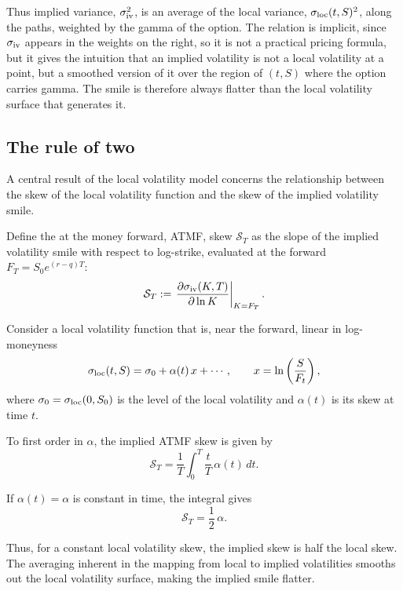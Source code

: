Thus implied variance, $\sigma_{\mathrm{iv}}^2$,
is an average of the local variance, $\sigma_{\mathrm{loc}}(t, S)^2$, along the paths,
weighted by the gamma of the option.
The relation is implicit, since $\sigma_{\mathrm{iv}}$ appears in the weights on the right,
so it is not a practical pricing formula,
but it gives the intuition that an implied volatility is not a local volatility at a point,
but a smoothed version of it over the region of $(t, S)$ where the option carries gamma.
The smile is therefore always flatter than the local volatility surface that generates it.

\subsection{The rule of two}\label{sec:rule_of_two}

A central result of the local volatility model concerns the relationship
between the skew of the local volatility function and the skew of the implied volatility smile.

Define the at the money forward, ATMF,
skew $\mathcal{S}_T$ as the slope of the implied volatility smile
with respect to log-strike, evaluated at the forward $F_T = S_0 e^{(r-q)T}$:
\begin{equation}\label{eq:atmf_skew}
    \mathcal{S}_T := \left.\frac{\partial \sigma_{\mathrm{iv}}(K,T)}{\partial \ln K}\right|_{K=F_T}.
\end{equation}

Consider a local volatility function that is, near the forward, linear in log-moneyness
\begin{equation}\label{eq:lv_skew_expansion}
    \sigma_{\mathrm{loc}}(t, S) = \sigma_0 + \alpha(t)\, x + \cdots, \qquad x = \ln\left(\frac{S}{F_t}\right),
\end{equation}
where $\sigma_0 = \sigma_{\mathrm{loc}}(0, S_0)$ is the level of the local volatility
and $\alpha(t)$ is its skew at time $t$.

To first order in $\alpha$, the implied ATMF skew is given by \cite[Ch. 2]{bergomi_stochastic_vol}
\begin{equation}\label{eq:atmf_skew_from_lv}
    \mathcal{S}_T = \frac{1}{T}\int_0^T \frac{t}{T}\,\alpha(t)\,dt .
\end{equation}

If $\alpha(t)=\alpha$ is constant in time, the integral gives
\begin{equation}\label{eq:factor_two}
    \mathcal{S}_T = \frac{1}{2}\,\alpha.
\end{equation}

Thus, for a constant local volatility skew, the implied skew is half the local skew.
The averaging inherent in the mapping from local to implied volatilities
smooths out the local volatility surface, making the implied smile flatter.

